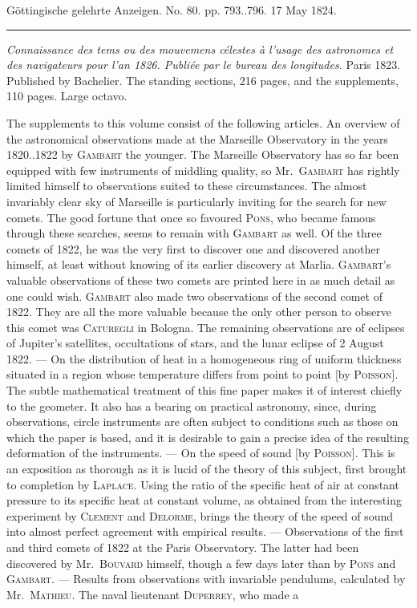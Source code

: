 \clearpage
{}
\hypertarget{native-643-lower}{}
\begin{center}\small Göttingische gelehrte Anzeigen. No. 80. pp. 793..796. 17 May 1824.\\[3pt]\rule{.72\linewidth}{.3pt}\end{center}

\emph{Connaissance des tems ou des mouvemens célestes à l'usage des astronomes et des navigateurs pour l'an \textup{1826}. Publiée par le bureau des longitudes.} Paris 1823. Published by Bachelier. The standing sections, 216 pages, and the supplements, 110 pages. Large octavo.

The supplements to this volume consist of the following articles. An overview of the astronomical observations made at the Marseille Observatory in the years 1820..1822 by \textsc{Gambart} the younger. The Marseille Observatory has so far been equipped with few instruments of middling quality, so Mr.\ \textsc{Gambart} has rightly limited himself to observations suited to these circumstances. The almost invariably clear sky of Marseille is particularly inviting for the search for new comets. The good fortune that once so favoured \textsc{Pons}, who became famous through these searches, seems to remain with \textsc{Gambart} as well. Of the three comets of 1822, he was the very first to discover one and discovered another himself, at least without knowing of its earlier discovery at Marlia. \textsc{Gambart}'s valuable observations of these two comets are printed here in as much detail as one could wish. \textsc{Gambart} also made two observations of the second comet of 1822. They are all the more valuable because the only other person to observe this comet was \textsc{Caturegli} in Bologna. The remaining observations are of eclipses of Jupiter's satellites, occultations of stars, and the lunar eclipse of 2 August 1822. --- On the distribution of heat in a homogeneous ring of uniform thickness situated in a region whose temperature differs from point to point [by \textsc{Poisson}]. The subtle mathematical treatment of this fine paper makes it of interest chiefly to the geometer. It also has a bearing on practical astronomy, since, during observations, circle instruments are often subject to conditions such as those on which the paper  is based, and it is desirable to gain a precise idea of the resulting deformation of the instruments. --- On the speed of sound [by \textsc{Poisson}]. This is an exposition as thorough as it is lucid of the theory of this subject, first brought to completion by \textsc{Laplace}. Using the ratio of the specific heat of air at constant pressure to its specific heat at constant volume, as obtained from the interesting experiment by \textsc{Clement} and \textsc{Delorme}, brings the theory of the speed of sound into almost perfect agreement with empirical results. --- Observations of the first and third comets of 1822 at the Paris Observatory. The latter had been discovered by Mr.\ \textsc{Bouvard} himself, though a few days later than by \textsc{Pons} and \textsc{Gambart}. --- Results from observations with invariable pendulums, calculated by Mr.\ \textsc{Mathieu}. The naval lieutenant \textsc{Duperrey}, who made a 